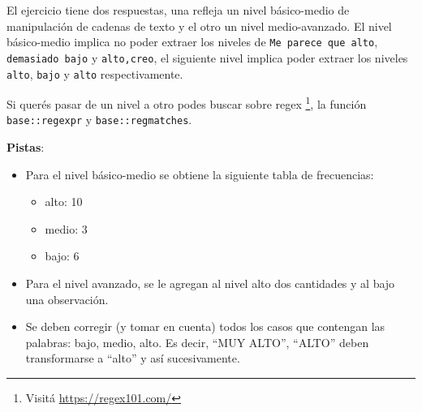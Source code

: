 \documentclass[
]{article}
\providecommand{\tightlist}{%
  \setlength{\itemsep}{0pt}\setlength{\parskip}{0pt}}
\begin{document}
El ejercicio tiene dos respuestas, una refleja un nivel básico-medio de
manipulación de cadenas de texto y el otro un nivel medio-avanzado. El
nivel básico-medio implica no poder extraer los niveles de
\texttt{\textquotesingle{}Me\ parece\ que\ alto\textquotesingle{}},
\texttt{\textquotesingle{}demasiado\ bajo\textquotesingle{}} y
\texttt{\textquotesingle{}alto,creo\textquotesingle{}}, el siguiente
nivel implica poder extraer los niveles \texttt{alto}, \texttt{bajo} y
\texttt{alto} respectivamente.

Si querés pasar de un nivel a otro podes buscar sobre regex \footnote{Visitá
  \url{https://regex101.com/}}, la función \texttt{base::regexpr} y
\texttt{base::regmatches}.

\textbf{Pistas}:

\begin{itemize}
\tightlist
\item
  Para el nivel básico-medio se obtiene la siguiente tabla de
  frecuencias:

  \begin{itemize}
  \tightlist
  \item
    alto: 10
  \item
    medio: 3
  \item
    bajo: 6
  \end{itemize}
\item
  Para el nivel avanzado, se le agregan al nivel alto dos cantidades y
  al bajo una observación.
\item
  Se deben corregir (y tomar en cuenta) todos los casos que contengan
  las palabras: bajo, medio, alto. Es decir, ``MUY ALTO'', ``ALTO''
  deben transformarse a ``alto'' y así sucesivamente.
\end{itemize}
\end{document}
